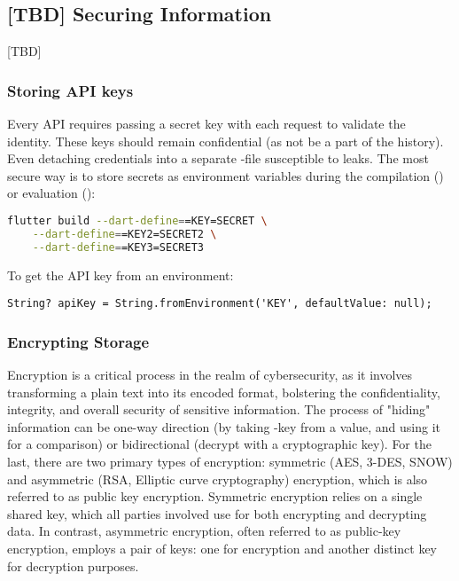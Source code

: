 
\subsection{[TBD] Securing Information}

[TBD]

\subsubsection{Storing API keys}

Every API requires passing a secret key with each request to validate the identity. These keys should remain 
confidential (as not be a part of the  history). Even detaching credentials into a separate -file  
susceptible to leaks. The most secure way is to store secrets as environment variables during the compilation 
() or evaluation ():

\begin{lstlisting}[language=bash]
flutter build --dart-define==KEY=SECRET \
    --dart-define==KEY2=SECRET2 \
    --dart-define==KEY3=SECRET3
\end{lstlisting}

\noindent To get the API key from an environment:

\begin{lstlisting}
String? apiKey = String.fromEnvironment('KEY', defaultValue: null);
\end{lstlisting}


\subsubsection{Encrypting Storage}

Encryption is a critical process in the realm of cybersecurity, as it involves transforming a plain text into its 
encoded format, bolstering the confidentiality, integrity, and overall security of sensitive information. The process 
of "hiding" information can be one-way direction (by taking \q{hash}-key from a value, and using it for a comparison) 
or bidirectional (decrypt with a cryptographic key). For the last, there are two primary types of encryption: symmetric 
(AES, 3-DES, SNOW) and asymmetric (RSA, Elliptic curve cryptography) encryption, which is also referred to as public 
key encryption. Symmetric encryption relies on a single shared key, which all parties involved use for both encrypting 
and decrypting data. In contrast, asymmetric encryption, often referred to as public-key encryption, employs a pair of 
keys: one for encryption and another distinct key for decryption purposes.

